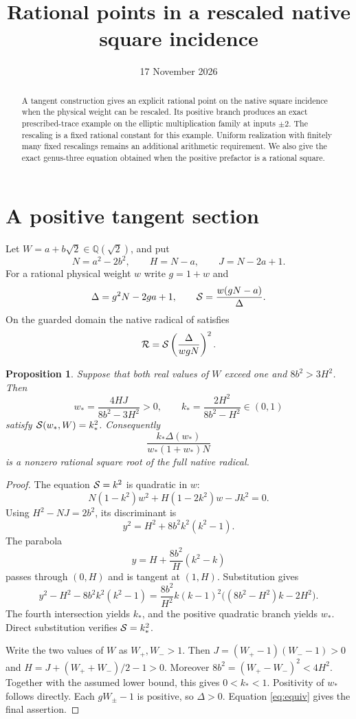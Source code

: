 \documentclass[11pt,a4paper]{article}
\title{Rational points in a rescaled native square incidence}
\author{}\date{17 November 2026}
\newtheorem{proposition}{Proposition}[section]
\newcommand{\Q}{\mathbb Q}\newcommand{\Z}{\mathbb Z}
\begin{document}
\maketitle
\begin{abstract}
A tangent construction gives an explicit rational point on the native
square incidence when the physical weight can be rescaled. Its positive
branch produces an exact prescribed-trace example on the elliptic
multiplication family at inputs $\pm2$. The rescaling is a fixed rational
constant for this example. Uniform realization with finitely many fixed
rescalings remains an additional arithmetic requirement. We also give
the exact genus-three equation obtained when the positive prefactor is
a rational square.
\end{abstract}

\section{A positive tangent section}

Let $W=a+b\sqrt2\in\Q(\sqrt2)$, and put
\[
 N=a^2-2b^2,\qquad H=N-a,\qquad J=N-2a+1.
\]
For a rational physical weight $w$ write $g=1+w$ and
\[
 \Delta=g^2N-2ga+1,\qquad
 {\cal S}=\frac{w(gN-a)}{\Delta}.
\]
On the guarded domain the native radical of \cite{Single} satisfies
\begin{equation}\label{eq:equiv}
 {\cal R}={\cal S}\left(\frac{\Delta}{wgN}\right)^2.
\end{equation}

\begin{proposition}\label{prop:tangent}
Suppose that both real values of $W$ exceed one and
$8b^2>3H^2$. Then
\[
 w_* =\frac{4HJ}{8b^2-3H^2}>0,\qquad
 k_* =\frac{2H^2}{8b^2-H^2}\in(0,1)
\]
satisfy ${\cal S}(w_*,W)=k_*^2$. Consequently
\[
 \frac{k_*\Delta(w_*)}{w_*(1+w_*)N}
\]
is a nonzero rational square root of the full native radical.
\end{proposition}
\begin{proof}
The equation ${\cal S}=k^2$ is quadratic in $w$:
\[
 N(1-k^2)w^2+H(1-2k^2)w-Jk^2=0.
\]
Using $H^2-NJ=2b^2$, its discriminant is
\[
 y^2=H^2+8b^2 k^2(k^2-1).
\]
The parabola
\[
 y=H+\frac{8b^2}{H}(k^2-k)
\]
passes through $(0,H)$ and is tangent at $(1,H)$. Substitution gives
\[
 y^2-H^2-8b^2k^2(k^2-1)
 =\frac{8b^2}{H^2}k(k-1)^2\bigl((8b^2-H^2)k-2H^2\bigr).
\]
The fourth intersection yields $k_*$, and the positive quadratic
branch yields $w_*$. Direct substitution verifies ${\cal S}=k_*^2$.

Write the two values of $W$ as $W_+,W_->1$. Then
$J=(W_+-1)(W_--1)>0$ and
$H=J+(W_++W_-)/2-1>0$. Moreover
$8b^2=(W_+-W_-)^2<4H^2$. Together with the assumed lower bound,
this gives $0<k_*<1$. Positivity of $w_*$ follows directly.
Each $gW_\pm-1$ is positive, so $\Delta>0$. Equation
\eqref{eq:equiv} gives the final assertion.
\end{proof}
\end{document}
